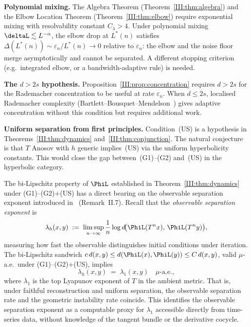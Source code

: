 \textbf{Polynomial mixing.}
The Algebra Theorem (Theorem~\ref{III:thm:algebra}) and the Elbow Location Theorem
(Theorem~\ref{III:thm:elbow}) require exponential mixing with resolvability constant
$C_\lambda > 4$.
Under polynomial mixing $\deltaL \lesssim L^{-\alpha}$, the elbow drop at
$L^*(n)$ satisfies $\Delta(L^*(n)) \sim \varepsilon_n / L^*(n) \to 0$ relative
to $\varepsilon_n$: the elbow and the noise floor merge asymptotically and
cannot be separated.
A different stopping criterion (e.g.\ integrated elbow, or a bandwidth-adaptive
rule) is needed.

\textbf{The $d > 2s$ hypothesis.}
Proposition~\ref{III:prop:concentration} requires $d > 2s$ for the Rademacher
concentration to be useful at rate $\varepsilon_n$.
When $d \leq 2s$, localised Rademacher complexity
(Bartlett--Bousquet--Mendelson~\cite{BartlettBousquetMendelson2005})
gives adaptive concentration without this condition but requires additional
work.

\textbf{Uniform separation from first principles.}
Condition~(US) is a hypothesis in Theorems~\ref{III:thm:dynamics}
and~\ref{III:thm:conjunction}.
The natural conjecture is that $T$ Anosov with $h$ generic implies~(US) via
the uniform hyperbolicity constants.
This would close the gap between~(G1)--(G2) and~(US) in the hyperbolic category.

\begin{remark}
\label{III:rem:lyapunov}
The bi-Lipschitz property of $\PhiL$ established in Theorem~\ref{III:thm:dynamics}
under (G1)--(G2)+(US) has a direct bearing on the observable separation exponent
introduced in~\cite{mahon_paper2} (Remark~II.7).
Recall that the \emph{observable separation exponent} is
\[
  \lambda_h(x,y)
  \;:=\; \limsup_{n\to\infty} \frac{1}{n}
  \log d\!\bigl(\PhiL(T^n x),\, \PhiL(T^n y)\bigr),
\]
measuring how fast the observable distinguishes initial conditions under iteration.
The bi-Lipschitz sandwich $c\,d(x,y) \leq d(\PhiL(x),\PhiL(y)) \leq C\,d(x,y)$,
valid $\mu$-a.e.\ under (G1)--(G2)+(US), implies
\[
  \lambda_h(x,y) \;=\; \lambda_1(x,y) \quad \mu\text{-a.e.},
\]
where $\lambda_1$ is the top Lyapunov exponent of $T$ in the ambient metric.
That is, under faithful reconstruction and uniform separation, the observable
separation rate and the geometric instability rate coincide.
This identifies the observable separation exponent as a computable proxy for
$\lambda_1$ accessible directly from time-series data, without knowledge of
the tangent bundle or the derivative cocycle.
\end{remark}

